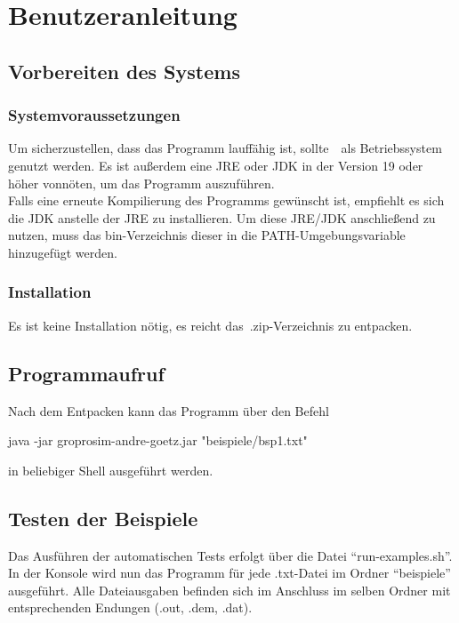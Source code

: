 \chapter{Benutzeranleitung}\label{ch:benutzeranleitung}


\section{Vorbereiten des Systems}\label{sec:vorbereiten-des-systems}

\subsection{Systemvoraussetzungen}\label{subsec:systemvoraussetzungen}
Um sicherzustellen, dass das Programm lauffähig ist, sollte~\Betriebssystem~als Betriebssystem genutzt werden.
Es ist außerdem eine JRE oder JDK in der Version 19 oder höher vonnöten, um das Programm auszuführen.\\
Falls eine erneute Kompilierung des Programms gewünscht ist, empfiehlt es sich die JDK anstelle der JRE zu installieren.
Um diese JRE/JDK anschließend zu nutzen, muss das bin-Verzeichnis dieser in die PATH-Umgebungsvariable hinzugefügt werden.
\subsection{Installation}\label{subsec:installation}
Es ist keine Installation nötig, es reicht das~.zip-Verzeichnis zu entpacken.

\section{Programmaufruf}\label{sec:programmaufruf}
Nach dem Entpacken kann das Programm über den Befehl
\begin{center}
    \colorbox{gray!20}{
        \begin{minipage}{0.9\textwidth}
            java -jar groprosim-andre-goetz.jar "beispiele/bsp1.txt"
        \end{minipage}
    }
\end{center}
in beliebiger Shell ausgeführt werden.
\section{Testen der Beispiele}\label{sec:testen-der-beispiele}
Das Ausführen der automatischen Tests erfolgt über die Datei \enquote{run-examples.sh}.
In der Konsole wird nun das Programm für jede .txt-Datei im Ordner \enquote{beispiele} ausgeführt.
Alle Dateiausgaben befinden sich im Anschluss im selben Ordner mit entsprechenden Endungen (.out, .dem, .dat).

